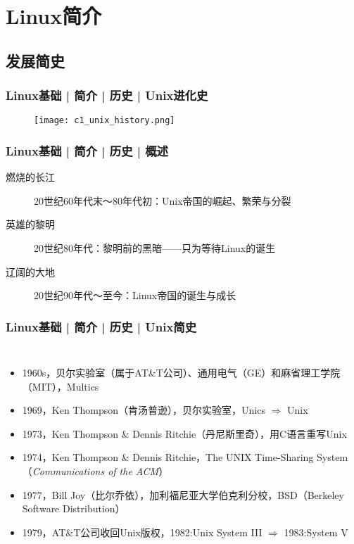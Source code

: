 \section{Linux简介}
\subsection{发展简史}
\begin{frame}
  \frametitle{Linux基础 | 简介 | 历史 | Unix进化史}
  \begin{figure}
    \centering
    \texttt{[image: c1\_unix\_history.png]}
  \end{figure}
\end{frame}

\begin{frame}
  \frametitle{Linux基础 | 简介 | 历史 | 概述}
  \begin{description}
    \item[燃烧的长江] 20世纪60年代末～80年代初：Unix帝国的崛起、繁荣与分裂
    \item[英雄的黎明] 20世纪80年代：黎明前的黑暗——只为等待Linux的诞生
    \item[辽阔的大地] 20世纪90年代～至今：Linux帝国的诞生与成长
  \end{description}
  \begin{figure}
    \centering
  \end{figure}
\end{frame}

\begin{frame}
  \frametitle{Linux基础 | 简介 | 历史 | Unix简史}
  \begin{columns}
  \begin{itemize}[<+->]
    \item 1960s，贝尔实验室（属于AT\&T公司）、通用电气（GE）和麻省理工学院（MIT），Multics
    \item 1969，Ken Thompson（肯\textbullet 汤普逊），贝尔实验室，Unics $\Rightarrow$ Unix
    \item 1973，\alert{Ken Thompson \& Dennis Ritchie}（丹尼斯\textbullet 里奇），用C语言重写\alert{Unix}
    \item 1974，Ken Thompson \& Dennis Ritchie，The UNIX Time-Sharing System（\textit{Communications of the ACM}）
    \item 1977，Bill Joy（比尔\textbullet 乔依），加利福尼亚大学伯克利分校，BSD（Berkeley Software Distribution）
    \item 1979，AT\&T公司收回Unix版权，1982:Unix System III $\Rightarrow$ 1983:System V
  \end{itemize}
    \vspace{0.2cm}
  \end{columns}
\end{frame}

